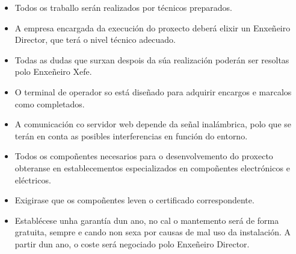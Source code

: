 \documentclass[11pt,twoside]{book}
\begin{document}
\begin{itemize}
    \item Todos os traballo serán realizados por técnicos preparados.
    \item A empresa encargada da execución do proxecto deberá elixir un Enxeñeiro Director, que terá o nivel técnico adecuado.
    \item Todas as dudas que surxan despois da súa realización poderán ser resoltas polo Enxeñeiro Xefe.
    \item O terminal de operador so está diseñado para adquirir encargos e marcalos como completados.
    \item A comunicación co servidor web depende da señal inalámbrica, polo que se terán en conta as posibles interferencias en función do entorno.
    \item Todos os compoñentes necesarios para o desenvolvemento do proxecto obteranse en establecementos especializados en compoñentes electrónicos e eléctricos.
    \item Exigirase que os compoñentes leven o certificado correspondente.
    \item Establécese unha garantía dun ano, no cal o mantemento será de forma gratuita, sempre e cando non sexa por causas de mal uso da instalación. A partir dun ano, o coste será negociado polo Enxeñeiro Director.
\end{itemize}

\stopcontents[parts]
\cleardoublepage
\pagestyle{empty}
\renewcommand{\documento}{ORZAMENTO}
\end{document}
